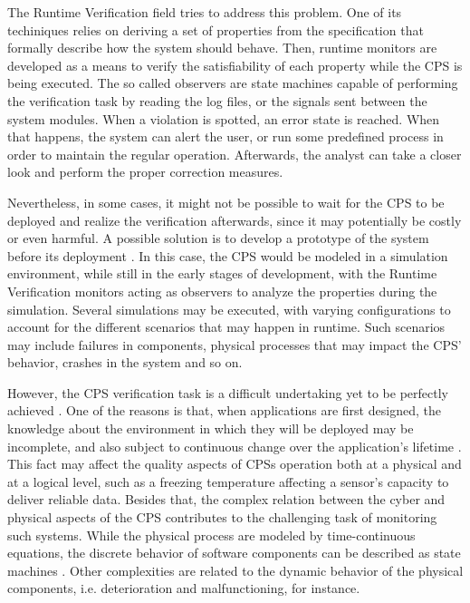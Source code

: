 The Runtime Verification field \cite{colombo2021runtime} tries to address this problem. One of its techiniques relies on deriving a set of properties from the specification that formally describe how the system should behave. Then, runtime monitors are developed as a means to verify the satisfiability of each property while the CPS is being executed. The so called observers are state machines capable of performing the verification task by reading the log files, or the signals sent between the system modules. When a violation is spotted, an error state is reached. When that happens, the system can alert the user, or run some predefined process in order to maintain the regular operation. Afterwards, the analyst can take a closer look and perform the proper correction measures.

Nevertheless, in some cases, it might not be possible to wait for the CPS to be deployed and realize the verification afterwards, since it may potentially be costly or even harmful. A possible solution is to develop a prototype of the system before its deployment \cite{mohamed2021model}. In this case, the CPS would be modeled in a simulation environment, while still in the early stages of development, with the Runtime Verification monitors acting as observers to analyze the properties during the simulation. Several simulations may be executed, with varying configurations to account for the different scenarios that may happen in runtime. Such scenarios may include failures in components, physical processes that may impact the CPS' behavior, crashes in the system and so on.


However, the CPS verification task is a difficult undertaking yet to be perfectly achieved \cite{patankar2020safety}. One of the reasons is that, when applications are first designed, the knowledge about the environment in which they will be deployed may be incomplete, and also subject to continuous change over the application's lifetime \cite{assurances2017}. This fact may affect the quality aspects of CPSs operation both at a physical and at a logical level, such as a freezing temperature affecting a sensor's capacity to deliver reliable data. Besides that, the complex relation between the cyber and physical aspects of the CPS contributes to the challenging task of monitoring such systems. While the physical process are modeled by time-continuous equations, the discrete behavior of software components can be described as state machines \cite{Baheti2019CyberPhysicalS}. Other complexities are related to the dynamic behavior of the physical components, i.e. deterioration and malfunctioning, for instance.

